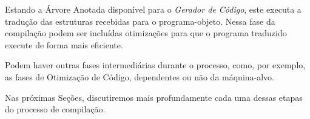 Estando a Árvore Anotada disponível para o \emph{Gerador de Código}, este
executa a tradução das estruturas recebidas para o programa-objeto. Nessa fase
da compilação podem ser incluídas otimizações para que o programa traduzido
execute de forma mais eficiente.

Podem haver outras fases intermediárias durante o processo, como, por exemplo,
as fases de Otimização de Código, dependentes ou não da máquina-alvo.

Nas próximas Seções, discutiremos mais profundamente cada uma dessas etapas
do processo de compilação.





